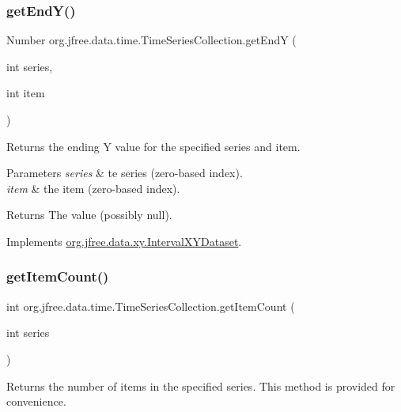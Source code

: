 \subsubsection{\texorpdfstring{get\+End\+Y()}{getEndY()}}
{\footnotesize\ttfamily Number org.\+jfree.\+data.\+time.\+Time\+Series\+Collection.\+get\+EndY (\begin{DoxyParamCaption}\item[{int}]{series,  }\item[{int}]{item }\end{DoxyParamCaption})}

Returns the ending Y value for the specified series and item.


\begin{DoxyParams}{Parameters}
{\em series} & te series (zero-\/based index). \\
\hline
{\em item} & the item (zero-\/based index).\\
\hline
\end{DoxyParams}
\begin{DoxyReturn}{Returns}
The value (possibly {\ttfamily null}). 
\end{DoxyReturn}


Implements \mbox{\hyperlink{interfaceorg_1_1jfree_1_1data_1_1xy_1_1_interval_x_y_dataset_ae938af574bad07e7f47a8b423223ef9b}{org.\+jfree.\+data.\+xy.\+Interval\+X\+Y\+Dataset}}.

\mbox{\label{classorg_1_1jfree_1_1data_1_1time_1_1_time_series_collection_a6e229bafa67272c19c73d3f553e3d29c}} 
\subsubsection{\texorpdfstring{get\+Item\+Count()}{getItemCount()}}
{\footnotesize\ttfamily int org.\+jfree.\+data.\+time.\+Time\+Series\+Collection.\+get\+Item\+Count (\begin{DoxyParamCaption}\item[{int}]{series }\end{DoxyParamCaption})}

Returns the number of items in the specified series. This method is provided for convenience.


